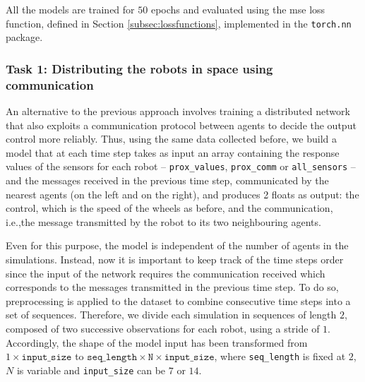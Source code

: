 All the models are trained for $50$ epochs and evaluated using the \gls{mse} loss 
function, defined in Section \ref{subsec:lossfunctions}, implemented in the 
\texttt{torch.nn} package.

\subsubsection{Task 1: Distributing the robots in space using communication}
\label{subsubsec:task1comm}

An alternative to the previous approach involves training a distributed network 
that also exploits a communication protocol between agents to decide the output 
control more reliably. 
Thus, using the same data collected before, we build a model that at each time 
step takes as input an array containing the response values of the sensors for each 
robot – \texttt{prox\_values}, \texttt{prox\_comm} or \texttt{all\_sensors} – and 
the messages received in the previous time step, communicated by the nearest 
agents (on the left and on the right), and produces 2 floats as output: the control, 
which is the speed of the wheels as before, and the communication, i.e.,the 
message transmitted by the robot to its two neighbouring agents.

Even for this purpose, the model is independent of the number of agents in 
the simulations. Instead, now it is important to keep track of the time steps order 
since the input of the network requires the communication received which 
corresponds to the messages transmitted in the previous time step. To do so, 
preprocessing is applied to the dataset to combine consecutive 
time steps into a set of sequences. Therefore, we divide each simulation in 
sequences of length $2$, composed of two successive observations for each 
robot, using a stride of $1$.   
Accordingly, the shape of the model input has been transformed from $1 \times 
\mathtt{input\_size}$ to $\mathtt{seq\_length} \times \mathtt{N} \times 
\mathtt{input\_size}$, where \texttt{seq\_length} is fixed at $2$, $N$ is variable 
and \texttt{input\_size} can be $7$ or $14$.

